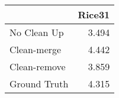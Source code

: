 \begin{tabular}{lr}
\toprule
{} & Rice31 \\
\midrule
No Clean Up  &  3.494 \\
Clean-merge  &  4.442 \\
Clean-remove &  3.859 \\
Ground Truth &  4.315 \\
\bottomrule
\end{tabular}
